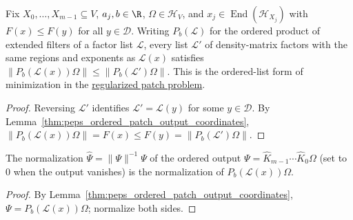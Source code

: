 \begin{lemma}
    \label{thm:peps_ordered_patch_minimizer}
    \leanok
    Fix $X_0,\ldots,X_{m-1}\subseteq V$, $a_j,b\in\R$, $\Omega\in\mathcal H_V$, and $x_j\in\operatorname{End}(\mathcal H_{X_j})$ with $F(x)\le F(y)$ for all $y\in\mathcal D$.
    Writing $P_b(\mathcal L)$ for the ordered product of extended filters of a factor list $\mathcal L$, every list $\mathcal L'$ of density-matrix factors with the same regions and exponents as $\mathcal L(x)$ satisfies
    $\|P_b(\mathcal L(x))\Omega\|\le\|P_b(\mathcal L')\Omega\|$.
    This is the ordered-list form of minimization in the
    \href{https://github.com/openai/math/blob/adc7f1241b42e322a6451854ab7e4b4c146bf78a/preprints/Polynomial-PEPS-approximation-of-gapped-square-grid-ground-states-September-24-2026/build/sections/03-patches.tex\#L68-L99}{regularized patch problem}.
\end{lemma}
\begin{proof}
    \leanok
    Reversing $\mathcal L'$ identifies $\mathcal L'=\mathcal L(y)$ for some $y\in\mathcal D$. By Lemma~\ref{thm:peps_ordered_patch_output_coordinates},
    $\|P_b(\mathcal L(x))\Omega\|=F(x)\le F(y)=\|P_b(\mathcal L')\Omega\|$.
\end{proof}

\begin{lemma}
    \label{thm:peps_ordered_patch_normalized_coordinates}
    \leanok
    The normalization $\widehat\Psi=\|\Psi\|^{-1}\Psi$ of the ordered output $\Psi=\widehat K_{m-1}\cdots\widehat K_0\Omega$ (set to $0$ when the output vanishes) is the normalization of $P_b(\mathcal L(x))\Omega$.
\end{lemma}
\begin{proof}
    \leanok
    By Lemma~\ref{thm:peps_ordered_patch_output_coordinates}, $\Psi=P_b(\mathcal L(x))\Omega$; normalize both sides.
\end{proof}

